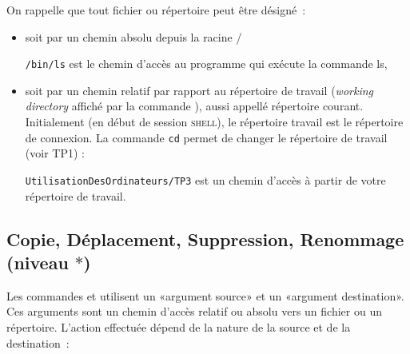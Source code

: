 \documentclass[a4paper,11pt]{article}
\newcommand{\shell}{\textsc{shell}}
\begin{document}
On rappelle que tout fichier ou répertoire peut être désigné :
\begin{itemize}
  \item soit par un chemin absolu depuis la racine / 

        \verb!/bin/ls! est le chemin d'accès au programme qui exécute la
        commande ls,
  \item soit par un chemin relatif par rapport au répertoire de travail
        (\emph{working directory} affiché par la commande ), aussi
        appellé répertoire courant.
        Initialement (en début de session \shell), le répertoire travail est le
        répertoire de connexion.  La commande \verb!cd! permet de 
        changer le répertoire de travail (voir TP1) :

        \verb!UtilisationDesOrdinateurs/TP3! est un chemin d'accès à partir de votre
        répertoire de travail.
\end{itemize}


\subsection{Copie, Déplacement, Suppression, Renommage (niveau $*$)}

Les commandes  et  utilisent un «argument source» et un
«argument destination». Ces arguments sont un chemin d'accès relatif
ou absolu vers un fichier ou un répertoire. L'action effectuée dépend
de la nature de la source et de la destination :
\end{document}
